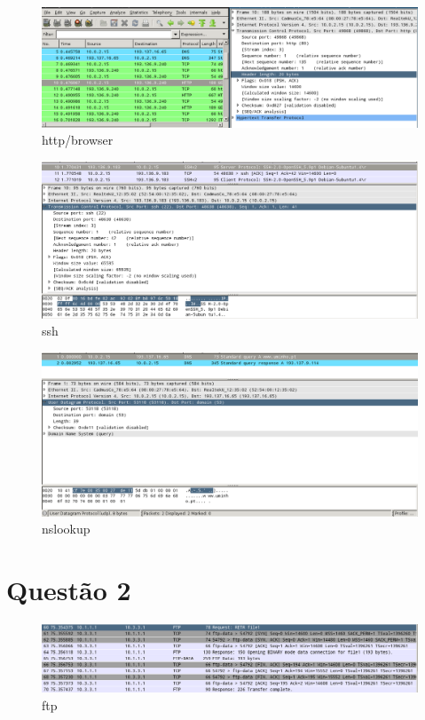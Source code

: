 \documentclass[a4paper]{report}
\begin{document}
\begin{figure}[H]
    \centering 
    \includegraphics[width=\textwidth]{images/http_browser.png}  
    \caption{http/browser}
    \label{fig:http_browser}
\end{figure}

\begin{figure}[H]
    \centering 
    \includegraphics[width=\textwidth]{images/ssh.png}  
    \caption{ssh}
    \label{fig:ssh}
\end{figure}

\begin{figure}[H]
    \centering 
    \includegraphics[width=\textwidth]{images/nslookup.png}  
    \caption{nslookup}
    \label{fig:nslookup}
\end{figure}

\chapter{Questão 2}
\begin{figure}[H]
    \centering 
    \includegraphics[width=\textwidth]{images/2ftp.png}  
    \caption{ftp}
    \label{fig:2ftp}
\end{figure}
\end{document}
